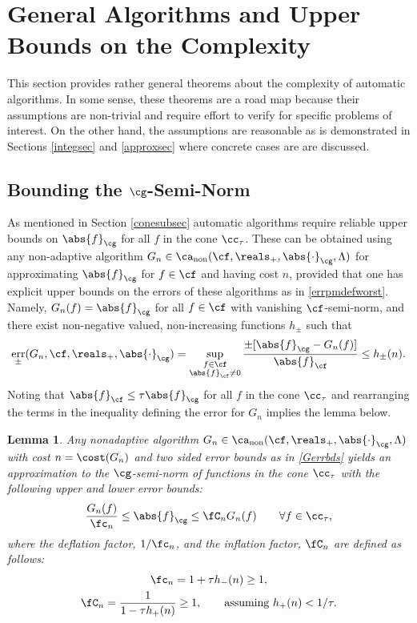 \documentclass[]{elsarticle}
\DeclareMathOperator{\fix}{non}
\DeclareMathOperator{\err}{err}
\newtheorem{lem}{Lemma}
\theoremstyle{definition}
\theoremstyle{remark}
\newcommand{\Fnorm}[1]{\abs{#1}_{\cf}}
\newcommand{\Gnorm}[1]{\abs{#1}_{\cg}}
\begin{document}
\section{General Algorithms and Upper Bounds on the Complexity} \label{genthmsec}

This section provides rather general theorems about the complexity of automatic algorithms.  In some sense, these theorems are a road map because their assumptions are non-trivial and require effort to verify for specific problems of interest.  On the other hand, the assumptions are reasonable as is demonstrated in Sections \ref{integsec} and \ref{approxsec} where concrete cases are are discussed.  

\subsection{Bounding the $\cg$-Semi-Norm} \label{Galgosec}

As mentioned in Section \ref{conesubsec} automatic algorithms require reliable upper bounds on $\Gnorm{f}$ for all $f$ in the cone $\cc_{\tau}$. These can be obtained using any non-adaptive algorithm $G_n \in \ca_{\fix}(\cf,\reals_+,\Gnorm{\cdot},\Lambda)$ for approximating $\Gnorm{f}$ for $f \in \cf$ and having cost $n$, provided that one has explicit upper bounds on the errors of these algorithms as in \eqref{errpmdefworst}.  Namely, $G_n(f)=\Gnorm{f}$ for all $f \in \cf$ with vanishing $\cf$-semi-norm, and there exist non-negative valued, non-increasing functions $h_{\pm}$ such that
\begin{equation} \label{Gerrbds}
\err_{\pm}(G_n,\cf,\reals_{+},\Gnorm{\cdot})
= \sup_{\substack{f \in \cf\\ \Fnorm{f}\ne 0}} \frac{\pm [\Gnorm{f}- G_n(f)]}{\Fnorm{f}} \le h_{ \pm}(n).
\end{equation}
Noting that $\Fnorm{f} \le \tau \Gnorm{f}$ for all $f$ in the cone $\cc_{\tau}$ and rearranging the terms in the inequality defining the error for $G_n$ implies the lemma below. 

\begin{lem} \label{Gnormlem} Any nonadaptive algorithm $G_n \in \ca_{\fix}(\cf,\reals_+,\Gnorm{\cdot},\Lambda)$ with cost $n=\cost(G_n)$ and two sided error bounds as in \eqref{Gerrbds} yields an approximation to the $\cg$-semi-norm of functions in the cone $\cc_{\tau}$ with the following upper and lower error bounds:
\begin{equation} \label{twosidedGineq}
\frac{G_n(f)}{\fc_n} \le \Gnorm{f} \le \fC_n G_n(f) \qquad \forall f \in \cc_{\tau},
\end{equation}
where the deflation factor, $1/\fc_n$, and the inflation factor, $\fC_n$ are defined as follows:
\begin{gather} \label{normdeflate}
\fc_n =1 + \tau h_{ -}(n)  \ge 1, \\
\label{norminflate}
\fC_n =\frac{1}{1 - \tau h_{ +}(n)} \ge 1, \qquad \text{assuming } h_{ +}(n) < 1/\tau.
\end{gather}
\end{lem}
\end{document}
